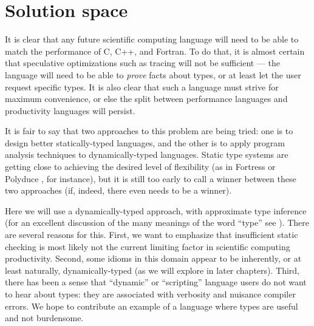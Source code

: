 


\section{Solution space}

It is clear that any future scientific computing language will need to be able to
match the performance of C, C++, and Fortran. To do that, it is almost certain
that speculative optimizations such as tracing \cite{tracingjit} will not be sufficient ---
the language will need to be able to \emph{prove} facts about types, or at least
let the user request specific types. It is also clear that such a language must
strive for maximum convenience, or else the split between performance languages
and productivity languages will persist.

It is fair to say that two approaches to this problem are being tried: one is
to design better statically-typed languages, and the other is to apply
program analysis techniques to dynamically-typed languages.
Static type systems are getting close to achieving the desired level
of flexibility (as in Fortress \cite{fortresspec} or Polyduce \cite{polyduce1},
for instance), but it is still too early to call a winner between these two
approaches (if, indeed, there even needs to be a winner).

Here we will use a dynamically-typed approach, with approximate
type inference
(for an excellent discussion of the many meanings of the word ``type''
see \cite{Kell2014}).
There are several reasons for this.
First, we want to emphasize that insufficient static
checking is most likely not the current limiting factor in scientific
computing productivity. Second, some idioms in this domain appear to be
inherently, or at least naturally, dynamically-typed (as we will explore in
later chapters). Third, there has been a sense that ``dynamic'' or
``scripting'' language users do not want to hear about types: they are
associated with verbosity and nuisance compiler errors. We hope to
contribute an example of a language where types are useful and not
burdensome.

